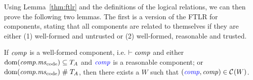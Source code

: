 \documentclass[acmsmall,screen]{acmart}\settopmatter{}
\renewcommand{\npair}[2][n]{#2}
\renewcommand{\comp}{\var{comp}}
\renewcommand{\lrcomp}[1][]{\typesetlr{C}^{#1}}
\newcommand{\wdjud}[2][ ]{#1 \vdash #2}
\begin{document}
%
Using Lemma~\ref{thm:ftlr} and the definitions of the logical relations, we can then prove the following two lemmas.
The first is a version of the FTLR for components, stating that all components are related to themselves if they are either (1) well-formed and untrusted or (2) well-formed, reasonable and trusted.
\begin{lemma}
  \label{lem:ftlr-comps}
  If $\comp$ is a well-formed component, i.e. $\wdjud{\comp}$ and either
    $\dom(\comp.\mscode) \subseteq \ta$ and $\src{\comp}$ is a reasonable component; or
    $\dom(\comp.\mscode) \mathrel{\#} \ta$,
  then there exists a $W$ such that
  $\npair{(\src{\comp},\comp)} \in \lrcomp(W)$.
\end{lemma}
\end{document}
